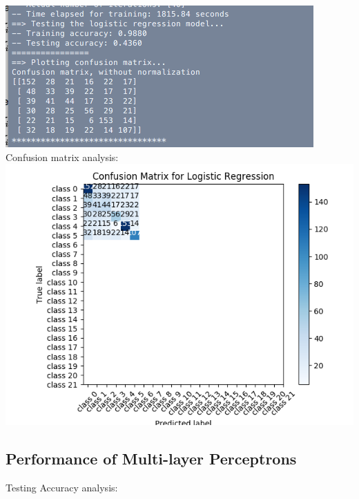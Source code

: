 \documentclass{article}
\begin{document}
\includegraphics[scale=0.7]{3.png}
\\
Confusion matrix analysis: 
\\
\includegraphics[scale=0.4]{logreg_cm.png}

\subsection{Performance of Multi-layer Perceptrons}

Testing Accuracy analysis: 
\end{document}
